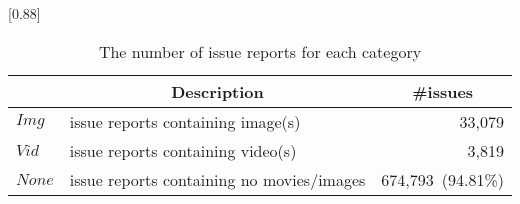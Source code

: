 
\begin{table}[t]
    \begin{center}
    \caption{The number of issue reports for each category}
    \scalebox{0.88}[0.88]{
    \begin{tabular}{llr}
        \toprule
         & \multicolumn{1}{c}{\textbf{Description}} & \multicolumn{1}{c}{\textbf{\#issues}} \\
        \midrule
        $Img$  & issue reports containing image(s) & 33,079\hspace{2.5mm}{\small (4.65\%)}\\%
        $Vid$  & issue reports containing video(s) & 3,819\hspace{2.5mm}{\small (0.54\%)}\\%
        $None$ & issue reports containing no movies/images & 674,793~{\small (94.81\%)}\\ 
        \bottomrule
    \end{tabular}
    }
    \label{tab:issue-category}
    \end{center}
    
\end{table}
